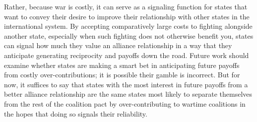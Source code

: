 \documentclass[12pt,letterpaper]{article}
\begin{document}
	Rather, because war is costly, it can serve as a signaling function for states that want to convey their desire to improve their relationship with other states in the international system. By accepting comparatively large costs to fighting alongside another state, especially when such fighting does not otherwise benefit you, states can signal how much they value an alliance relationship in a way that they anticipate generating reciprocity and payoffs down the road. Future work should examine whether states are making a smart bet in anticipating future payoffs from costly over-contributions; it is possible their gamble is incorrect. But for now, it suffices to say that states with the most interest in future payoffs from a better alliance relationship are the same states most likely to separate themselves from the rest of the coalition pact by over-contributing to wartime coalitions in the hopes that doing so signals their reliability.



\end{document}
